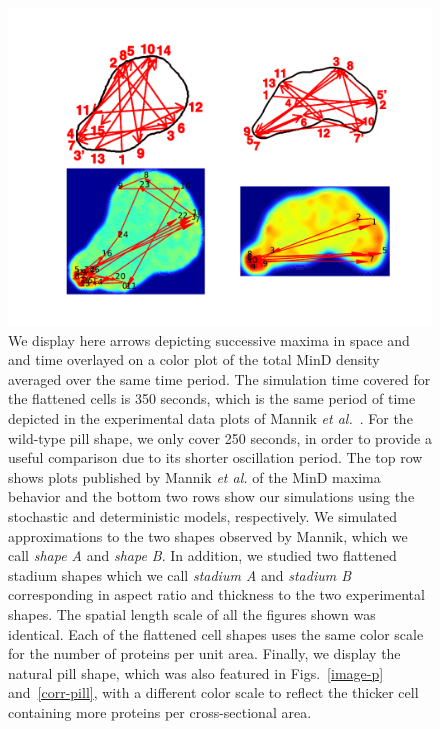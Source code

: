 \documentclass[10pt,letterpaper]{article}
\begin{document}
\begin{figure}
  \centering
  \includegraphics[width=16cm]{../paper/plot-ave}
  \caption{We display here arrows depicting successive maxima in space
    and and time overlayed on a color plot of the total MinD density
    averaged over the same time period.  The simulation time covered
    for the flattened cells is 350 seconds, which is the same
    period of time depicted in the experimental data plots of Mannik
    \emph{et al.}~\cite{mannik2012robustness}.  For the wild-type pill
    shape, we only cover 250 seconds, in order to provide a
    useful comparison due to its shorter oscillation period.  The top
    row shows plots published by Mannik \emph{et al.} of the MinD maxima behavior
    and the bottom two rows show our simulations using the stochastic
    and deterministic models, respectively.  We simulated
    approximations to the two shapes observed by Mannik, which we call
    \emph{shape A} and \emph{shape B}.  In addition, we studied two
    flattened stadium shapes which we call \emph{stadium A} and
    \emph{stadium B} corresponding in aspect ratio and thickness to
    the two experimental shapes.  The spatial length scale of all the
    figures shown was identical. Each of the flattened cell shapes
    uses the same color scale for the number of proteins per unit
    area.  Finally, we display the natural pill shape, which was also
    featured in Figs.~\ref{image-p} and~\ref{corr-pill}, with a
    different color scale to reflect the thicker cell containing more
    proteins per cross-sectional area.  }
  \label{randst-plot-ave}
\end{figure}
\end{document}
